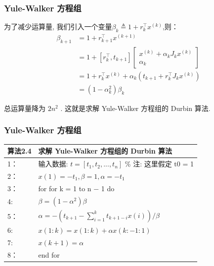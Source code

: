 \documentclass[notheorems,serif]{beamer}
\begin{document}
\begin{frame}
\frametitle{Yule-Walker 方程组}
为了减少运算量, 我们引入一个变量$\beta_{k} \triangleq 1+r_{k}^{\top} x^{(k)}$,则：
\begin{equation}
\begin{aligned} \beta_{k+1} &=1+r_{k+1}^{\top} x^{(k+1)} \\ &=1+\left[r_{k}^{\top}, t_{k+1}\right]\left[\begin{array}{c}{x^{(k)}+\alpha_{k} J_{k} x^{(k)}} \\ {\alpha_{k}}\end{array}\right] \\ &=1+r_{k}^{\top} x^{(k)}+\alpha_{k}\left(t_{k+1}+r_{k}^{\top} J_{k} x^{(k)}\right) \\ &=\left(1-\alpha_{k}^{2}\right) \beta_{k} \end{aligned}
\end{equation}

总运算量降为 $2n^2$
. 这就是求解 Yule-Walker 方程组的 Durbin 算法.
\end{frame}

\begin{frame}
\frametitle{Yule-Walker 方程组}
\begin{table}  
	\begin{tabular*}{16cm}{ll}  
		\hline  
		算法2.4  &求解 Yule-Walker 方程组的 Durbin 算法\\  
		\hline  
		1：   & 输入数据: $t = [t_1, t_2, . . . , t_n]$ \% 注: 这里假定 t0 = 1\\  
		2：   & $x(1) = −t_1, β = 1, α = −t_1$\\
		3：   & for for k = 1 to n − 1 do \\
		4:    & \qquad $\beta=(1-\alpha^2)\beta$\\
		5：   & \qquad $\alpha=-\left(t_{k+1}-\sum_{i=1}^{k} t_{k+1-i} x(i)\right) / \beta$\\
		6:    & \qquad $x(1 : k)=x(1 : k)+\alpha x(k :-1 : 1)$\\
		7:   &$x(k+1)=\alpha$\\
		8：   & end for\\
		\hline  
	\end{tabular*}  
\end{table}
\end{frame}
\end{document}
